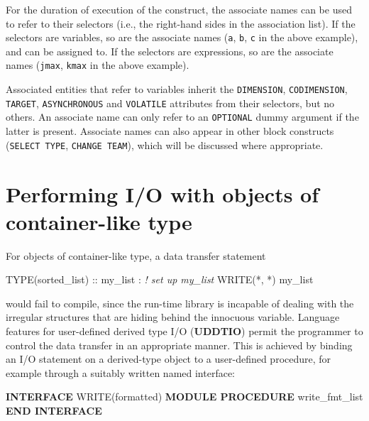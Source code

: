 \documentclass[
]{article}
\newenvironment{Shaded}{}{}
\newcommand{\CommentTok}[1]{\textcolor[rgb]{0.38,0.63,0.69}{\textit{#1}}}
\newcommand{\DataTypeTok}[1]{\textcolor[rgb]{0.56,0.13,0.00}{#1}}
\newcommand{\FunctionTok}[1]{\textcolor[rgb]{0.02,0.16,0.49}{#1}}
\newcommand{\KeywordTok}[1]{\textcolor[rgb]{0.00,0.44,0.13}{\textbf{#1}}}
\newcommand{\NormalTok}[1]{#1}
\begin{document}
For the duration of execution of the construct, the associate names can
be used to refer to their selectors (i.e., the right-hand sides in the
association list). If the selectors are variables, so are the associate
names (\texttt{a}, \texttt{b}, \texttt{c} in the above example), and can
be assigned to. If the selectors are expressions, so are the associate
names (\texttt{jmax}, \texttt{kmax} in the above example).

Associated entities that refer to variables inherit the
\texttt{DIMENSION}, \texttt{CODIMENSION}, \texttt{TARGET},
\texttt{ASYNCHRONOUS} and \texttt{VOLATILE} attributes from their
selectors, but no others. An associate name can only refer to an
\texttt{OPTIONAL} dummy argument if the latter is present. Associate
names can also appear in other block constructs (\texttt{SELECT\ TYPE},
\texttt{CHANGE\ TEAM}), which will be discussed where appropriate.

\section{Performing I/O with objects of container-like
type}\label{performing-io-with-objects-of-container-like-type}

For objects of container-like type, a data transfer statement

\begin{Shaded}
\begin{Highlighting}[]
\DataTypeTok{TYPE(sorted\_list)} \DataTypeTok{::}\NormalTok{ my\_list}
\NormalTok{: }\CommentTok{! set up my\_list}
\FunctionTok{WRITE(*}\NormalTok{, }\FunctionTok{*)}\NormalTok{ my\_list}
\end{Highlighting}
\end{Shaded}

would fail to compile, since the run-time library is incapable of
dealing with the irregular structures that are hiding behind the
innocuous variable. Language features for user-defined derived type I/O
(\textbf{UDDTIO}) permit the programmer to control the data transfer in
an appropriate manner. This is achieved by binding an I/O statement on a
derived-type object to a user-defined procedure, for example through a
suitably written named interface:

\begin{Shaded}
\begin{Highlighting}[]
\KeywordTok{INTERFACE} \FunctionTok{WRITE(formatted)}
   \KeywordTok{MODULE PROCEDURE}\NormalTok{ write\_fmt\_list}
\KeywordTok{END INTERFACE}
\end{Highlighting}
\end{Shaded}
\end{document}
